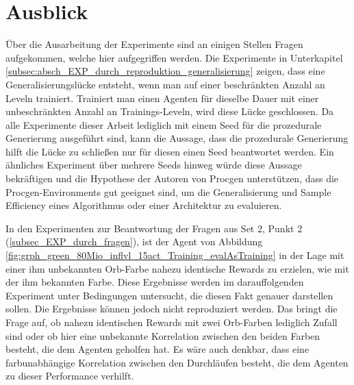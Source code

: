 \section{Ausblick}\label{ausblick}


	
Über die Ausarbeitung der Experimente sind an einigen Stellen Fragen aufgekommen, welche hier aufgegriffen werden. Die Experimente in Unterkapitel \ref{subsec:absch_EXP_durch_reproduktion_generalisierung} zeigen, dass eine Generalisierungslücke entsteht, wenn man auf einer beschränkten Anzahl an Leveln trainiert. Trainiert man einen Agenten für dieselbe Dauer mit einer unbeschränkten Anzahl an Trainings-Leveln, wird diese Lücke geschlossen. Da alle Experimente dieser Arbeit lediglich mit einem Seed für die prozedurale Generierung ausgeführt sind, kann die Aussage, dass die prozedurale Generierung hilft die Lücke zu schließen nur für diesen einen Seed beantwortet werden. Ein ähnliches Experiment über mehrere Seeds hinweg würde diese Aussage bekräftigen und die Hypothese der Autoren von Procgen unterstützen, dass die Procgen-Environments gut geeignet sind, um die Generalisierung und Sample Efficiency eines Algorithmus oder einer Architektur zu evaluieren. 

In den Experimenten zur Beantwortung der Fragen aus Set 2, Punkt 2 (\ref{subsec_EXP_durch_fragen}), ist der Agent von Abbildung \ref{fig:grph_green_80Mio_inflvl_15act_Training_evalAsTraining} in der Lage mit einer ihm unbekannten Orb-Farbe nahezu identische Rewards zu erzielen, wie mit der ihm bekannten Farbe. Diese Ergebnisse werden im darauffolgenden Experiment unter Bedingungen untersucht, die diesen Fakt genauer darstellen sollen. Die Ergebnisse können jedoch nicht reproduziert werden. Das bringt die Frage auf, ob nahezu identischen Rewards mit zwei Orb-Farben lediglich Zufall sind oder ob hier eine unbekannte Korrelation zwischen den beiden Farben besteht, die dem Agenten geholfen hat. Es wäre auch denkbar, dass eine farbunabhängige Korrelation zwischen den Durchläufen besteht, die dem Agenten zu dieser Performance verhilft.

